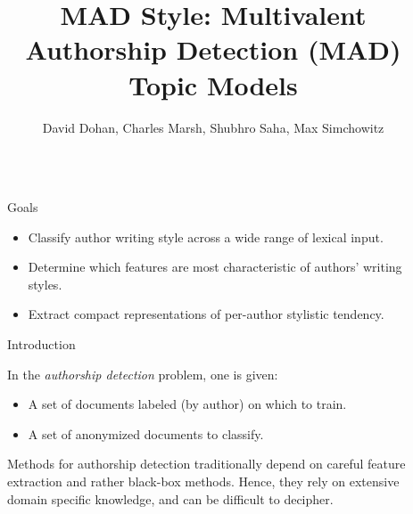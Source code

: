 \documentclass[final]{beamer}
\title{MAD Style: Multivalent Authorship Detection (MAD) Topic Models} %
\author{David Dohan, Charles Marsh, Shubhro Saha, Max Simchowitz} %
\institute{Princeton University, Department of Computer Science} %
\newlength{\sepwid}
\newlength{\onecolwid}
\begin{document}

\setlength{\belowcaptionskip}{2ex} %
\setlength\belowdisplayshortskip{2ex} %

\begin{frame}[t]  %

\begin{columns}[t] %

\begin{column}{\sepwid}\end{column} %

\begin{column}{\onecolwid} %


\begin{alertblock}{Goals}
\begin{itemize}
\item Classify author writing style across a wide range of lexical input.
\item Determine which features are most characteristic of authors' writing styles.
\item Extract compact representations of per-author stylistic tendency.
\end{itemize}
\end{alertblock}


\begin{block}{Introduction}

In the \textit{authorship detection} problem, one is given:
\begin{itemize}
\item A set of documents labeled (by author) on which to train.
\item A set of anonymized documents to classify.
\end{itemize} Methods for authorship detection traditionally depend on careful feature extraction and rather black-box methods. Hence, they rely on extensive domain specific knowledge, and can be difficult to decipher.


\end{block}
\end{column}
\end{columns}
\end{frame}
\end{document}
